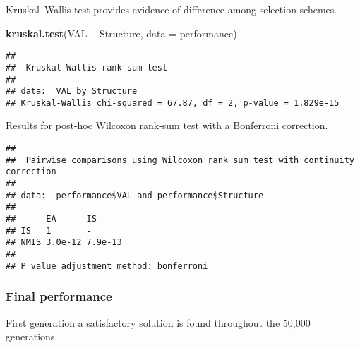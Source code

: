 \documentclass[]{book}
\newenvironment{Shaded}{\begin{snugshade}}{\end{snugshade}}
\newcommand{\DataTypeTok}[1]{\textcolor[rgb]{0.13,0.29,0.53}{#1}}
\newcommand{\KeywordTok}[1]{\textcolor[rgb]{0.13,0.29,0.53}{\textbf{#1}}}
\newcommand{\NormalTok}[1]{#1}
\newcommand{\OperatorTok}[1]{\textcolor[rgb]{0.81,0.36,0.00}{\textbf{#1}}}
\newcommand{\OtherTok}[1]{\textcolor[rgb]{0.56,0.35,0.01}{#1}}
\newcommand{\StringTok}[1]{\textcolor[rgb]{0.31,0.60,0.02}{#1}}
\begin{document}
Kruskal--Wallis test provides evidence of difference among selection schemes.

\begin{Shaded}
\begin{Highlighting}[]
\KeywordTok{kruskal.test}\NormalTok{(VAL }\OperatorTok{~}\StringTok{ }\NormalTok{Structure, }\DataTypeTok{data =}\NormalTok{ performance)}
\end{Highlighting}
\end{Shaded}

\begin{verbatim}
## 
##  Kruskal-Wallis rank sum test
## 
## data:  VAL by Structure
## Kruskal-Wallis chi-squared = 67.87, df = 2, p-value = 1.829e-15
\end{verbatim}

Results for post-hoc Wilcoxon rank-sum test with a Bonferroni correction.

\begin{Shaded}
\end{Shaded}

\begin{verbatim}
## 
##  Pairwise comparisons using Wilcoxon rank sum test with continuity correction 
## 
## data:  performance$VAL and performance$Structure 
## 
##      EA      IS     
## IS   1       -      
## NMIS 3.0e-12 7.9e-13
## 
## P value adjustment method: bonferroni
\end{verbatim}

\hypertarget{final-performance-5}{%
\subsubsection{Final performance}\label{final-performance-5}}

First generation a satisfactory solution is found throughout the 50,000 generations.
\end{document}
